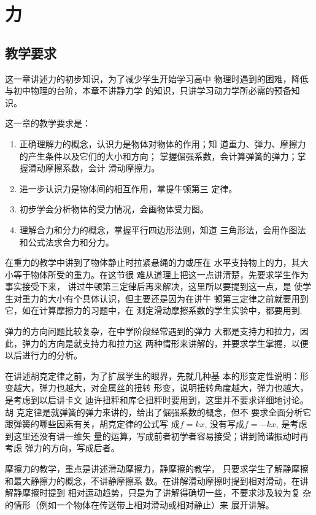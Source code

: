 \chapter{力}
\section{教学要求}
这一章讲述力的初步知识，为了减少学生开始学习高中
物理时遇到的困难，降低与初中物理的台阶，本章不讲静力学
的知识，只讲学习动力学所必需的预备知识。


这一章的教学要求是：

\begin{enumerate}
\item 正确理解力的概念，认识力是物体对物体的作用；知
道重力、弹力、摩擦力的产生条件以及它们的大小和方向；
掌握倔强系数，会计算弹簧的弹力；掌握滑动摩擦系数，会计
滑动摩擦力。
\item 进一步认识力是物体间的相互作用，掌提牛顿第三
定律。
\item 
初步学会分析物体的受力情况，会画物体受力图。
\item 理解合力和分力的概念，掌握平行四边形法则，知道
三角形法，会用作图法和公式法求合力和分力。
\end{enumerate}

在重力的教学中讲到了物体静止时拉紧悬绳的力或压在
水平支持物上的力，其大小等于物体所受的重力。在这节很
难从道理上把这一点讲清楚，先要求学生作为事实接受下来，
讲过牛顿第三定律后再来解决，这里所以要提到这一点，是
使学生对重力的大小有个具体认识，但主要还是因为在讲牛
顿第三定律之前就要用到它，如在计算摩擦力的习题中，在
测定滑动摩擦系数的学生实验中，都要用到.

弹力的方向问题比较复杂，在中学阶段经常遇到的弹力
大都是支持力和拉力，因此，弹力的方向是就支持力和拉力这
两种情形来讲解的，并要求学生掌握，以便以后进行力的分析。

在讲述胡克定律之前，为了扩展学生的眼界，先就几种基
本的形变定性说明：形变越大，弹力也越大，对金属丝的扭转
形变，说明扭转角度越大，弹力也越大，是考虑到以后讲卡文
迪许扭秤和库仑扭秤时要用到，这里并不要求详细地讨论。胡
克定律是就弹簧的弹力来讲的，给出了倔强系数的概念，但不
要求全面分析它跟弹簧的哪些因素有关，胡克定律的公式写
成$f=kx$, 没有写成$f=-kx$, 是考虑到这里还没有讲一维矢
量的运算，写成前者初学者容易接受；讲到简谐振动时再考虑
弹力的方向，写成后者。

摩擦力的教学，重点是讲述滑动摩擦力，静摩擦的教学，
只要求学生了解静摩擦和最大静擦力的概念，不讲静摩擦系
数。在讲解滑动摩擦时提到相对滑动，在讲解静摩擦时提到
相对运动趋势，只是为了讲解得确切一些，不要求涉及较为复
杂的情形（例如一个物体在传送带上相对滑动或相对静止）来
展开讲解。

